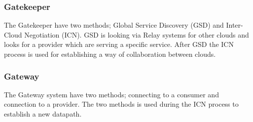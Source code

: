 \subsubsection{Gatekeeper}
The Gatekeeper have two methods; Global Service Discovery (GSD) and Inter-Cloud Negotiation (ICN).  
GSD is looking via Relay systems for other clouds and looks for a provider which are serving a specific service. 
After GSD the ICN process is used for establishing a way of collaboration between clouds. 

\subsubsection{Gateway}
The Gateway system have two methods; connecting to a consumer and connection to a provider. 
The two methods is used during the ICN process to establish a new datapath. 